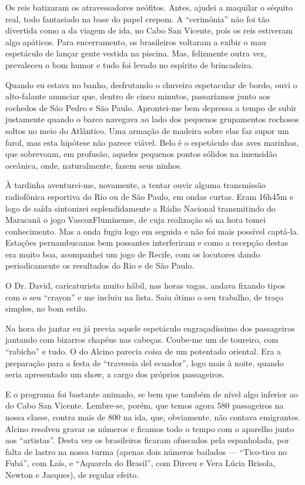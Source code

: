 Os reis batizaram os atravessadores neófitos. Antes, ajudei a maquilar o séquito real, todo fantasiado na base do papel crepom. A ``cerimônia'' não foi tão divertida como a da viagem de ida, no Cabo San Vicente, pois os reis estiveram algo apáticos. Para encerramento, os brasileiros voltaram a exibir o mau espetáculo de lançar gente vestida na piscina. Mas, felizmente outra vez, prevaleceu o bom humor e tudo foi levado no espírito de brincadeira.

Quando eu estava no banho, desfrutando o chuveiro espetacular de bordo, ouvi o alto-falante anunciar que, dentro de cinco minutos, passaríamos junto aos rochedos de São Pedro e São Paulo. Aprontei-me bem depressa a tempo de subir justamente quando o barco navegava ao lado dos pequenos grupamentos rochosos soltos no meio do Atlântico. Uma armação de madeira sobre elas faz supor um farol, mas esta hipótese não parece viável. Belo é o espetáculo das aves marinhas, que sobrevoam, em profusão, aqueles pequenos pontos sólidos na imensidão oceânica, onde, naturalmente, fazem seus ninhos.

À tardinha aventurei-me, novamente, a tentar ouvir alguma transmissão radiofônica esportiva do Rio ou de São Paulo, em ondas curtas. Eram 16h45m e logo de saída sintonizei esplendidamente a Rádio Nacional transmitindo do Maracanã o jogo VascoxFluminense, de cuja realização só na hora tomei conhecimento. Mas a onda fugiu logo em seguida e não foi mais possível captá-la. Estações pernambucanas bem possantes interferiram e como a recepção destas era muito boa, acompanhei um jogo de Recife, com os locutores dando periodicamente os resultados do Rio e de São Paulo.

O Dr. David, caricaturista muito hábil, nas horas vagas, andava fixando tipos com o seu ``crayon'' e me incluiu na lista. Saiu ótimo o seu trabalho, de traço simples, no bom estilo.

Na hora do jantar eu já previa aquele espetáculo engraçadíssimo dos passageiros jantando com bizarros chapéus nas cabeças. Coube-me um de toureiro, com ``rabicho'' e tudo. O do Alcino parecia coisa de um potentado oriental. Era a preparação para a festa de ``travessia del ecuador'', logo mais à noite, quando seria apresentado um show, a cargo dos próprios passageiros.

E o programa foi bastante animado, se bem que também de nível algo inferior ao do Cabo San Vicente. Lembre-se, porém, que temos agora 580 passageiros na nossa classe, contra mais de 800 na ida, que, obviamente, não contava emigrantes. Alcino resolveu gravar os números e ficamos todo o tempo com o aparelho junto aos ``artistas''. Desta vez os brasileiros ficaram ofuscados pela espanholada, por falta de lastro na nossa turma (apenas dois números bailados --- ``Tico-tico no Fubá'', com Laís, e ``Aquarela do Brasil'', com Dirceu e Vera Lúcia Brisola, Newton e Jacques), de regular efeito.

